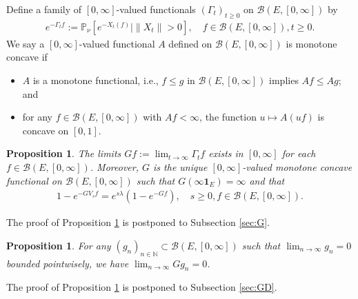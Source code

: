 \documentclass[12pt,a4paper]{amsart}
\numberwithin{equation}{section}
\theoremstyle{plain}
\newtheorem{prop}[thm]{Proposition}
\theoremstyle{definition}
\theoremstyle{remark}
\newcounter{N}
\newcounter{n}[N]
\begin{document}
Define a family of $[0,\infty]$-valued functionals $(\Gamma_t)_{t\geq 0}$ on $\mathcal B(E,[0,\infty])$ by
\begin{align}
 e^{-\Gamma_t f}
:= \mathbb P_{\nu}[e^{- X_t(f)}| \|X_t\| > 0],
 \quad f\in \mathcal B(E,[0,\infty]), t \geq 0.
 \end{align}
We say a $[0,\infty]$-valued functional $A$ defined on $\mathcal B(E,[0,\infty])$ is monotone concave if
\begin{itemize}
\item
$A$ is a monotone functional, i.e., $f\leq g$ in $\mathcal B(E,[0,\infty])$ implies $Af \leq Ag$; and
\item
for any $f\in \mathcal B(E,[0,\infty])$ with $Af< \infty$, the function $u \mapsto A(uf)$ is concave on $[0,1]$.
\end{itemize}
\begin{prop} \label{Proposition:G:H1:H2:H3:H4}
The limits $Gf:= \lim_{t\to \infty} \Gamma_t f$ exists in $[0,\infty]$ for each $f\in \mathcal B(E,[0,\infty])$.
Moreover, $G$ is the unique $[0,\infty]$-valued monotone concave functional on 
$\mathcal B(E,[0,\infty])$ such that $G(\infty \mathbf 1_E) = \infty$ and that
\begin{align}
\label{eq:G.0}
1 - e^{- GV_s f}
= e^{s\lambda} (1 - e^{-Gf}),
\quad s\geq 0, f\in \mathcal B(E,[0,\infty]).
\end{align}
\end{prop}

The proof of Proposition \ref{Proposition:G:H1:H2:H3:H4} is postponed to Subsection \ref{sec:G}.

\begin{prop} \label{Proposition:GD:H1:H2:H3:H4}
For any $(g_n)_{n\in \mathbb N} \subset \mathcal B(E,[0,\infty])$ such that $\lim_{n\to \infty} g_n = 0$ bounded pointwisely, we have $\lim_{n\to \infty} G g_n = 0$.
\end{prop}

The proof of Proposition \ref{Proposition:GD:H1:H2:H3:H4} is postponed to Subsection \ref{sec:GD}.
\end{document}
